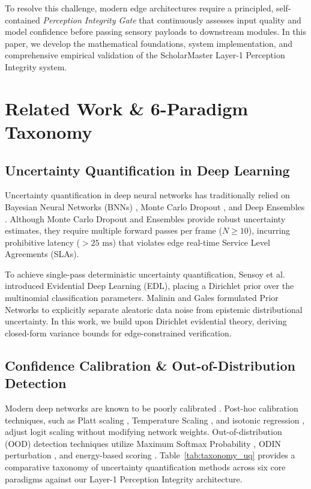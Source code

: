 \documentclass[conference]{IEEEtran}
\begin{document}
To resolve this challenge, modern edge architectures require a principled, self-contained \textit{Perception Integrity Gate} that continuously assesses input quality and model confidence before passing sensory payloads to downstream modules. In this paper, we develop the mathematical foundations, system implementation, and comprehensive empirical validation of the ScholarMaster Layer-1 Perception Integrity system.

\section{Related Work \& 6-Paradigm Taxonomy}
\subsection{Uncertainty Quantification in Deep Learning}
Uncertainty quantification in deep neural networks has traditionally relied on Bayesian Neural Networks (BNNs) \cite{blundell2015weight}, Monte Carlo Dropout \cite{gal2016dropout}, and Deep Ensembles \cite{lakshminarayanan2017simple}. Although Monte Carlo Dropout and Ensembles provide robust uncertainty estimates, they require multiple forward passes per frame ($N \ge 10$), incurring prohibitive latency ($>25\text{ ms}$) that violates edge real-time Service Level Agreements (SLAs). 

To achieve single-pass deterministic uncertainty quantification, Sensoy et al. \cite{sensoy2018evidential} introduced Evidential Deep Learning (EDL), placing a Dirichlet prior over the multinomial classification parameters. Malinin and Gales \cite{malinin2018predictive} formulated Prior Networks to explicitly separate aleatoric data noise from epistemic distributional uncertainty. In this work, we build upon Dirichlet evidential theory, deriving closed-form variance bounds for edge-constrained verification.

\subsection{Confidence Calibration & Out-of-Distribution Detection}
Modern deep networks are known to be poorly calibrated \cite{guo2017calibration}. Post-hoc calibration techniques, such as Platt scaling \cite{platt1999probabilistic}, Temperature Scaling \cite{guo2017calibration}, and isotonic regression \cite{zadrozny2002transforming}, adjust logit scaling without modifying network weights. Out-of-distribution (OOD) detection techniques utilize Maximum Softmax Probability \cite{hendrycks2016baseline}, ODIN perturbation \cite{liang2017enhancing}, and energy-based scoring \cite{liu2020energy}. Table~\ref{tab:taxonomy_uq} provides a comparative taxonomy of uncertainty quantification methods across six core paradigms against our Layer-1 Perception Integrity architecture.
\end{document}
